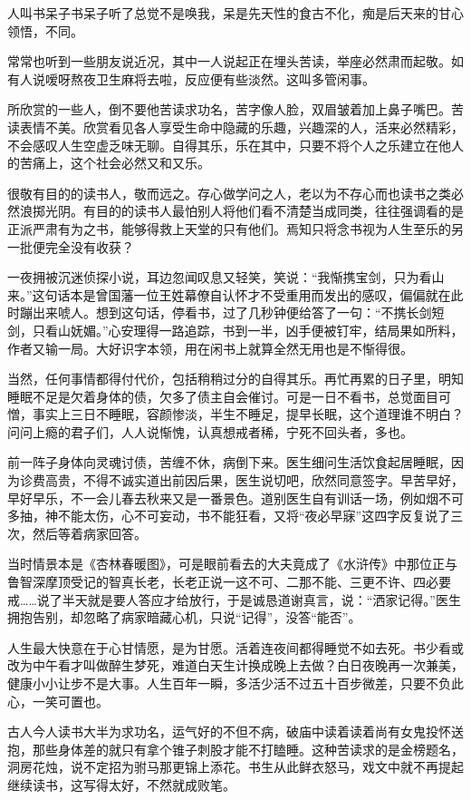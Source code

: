 \par 人叫书呆子书呆子听了总觉不是唤我，呆是先天性的食古不化，痴是后天来的甘心领悟，不同。
\par 常常也听到一些朋友说近况，其中一人说起正在埋头苦读，举座必然肃而起敬。如有人说嗳呀熬夜卫生麻将去啦，反应便有些淡然。这叫多管闲事。
\par 所欣赏的一些人，倒不要他苦读求功名，苦字像人脸，双眉皱着加上鼻子嘴巴。苦读表情不美。欣赏看见各人享受生命中隐藏的乐趣，兴趣深的人，活来必然精彩，不会感叹人生空虚乏味无聊。自得其乐，乐在其中，只要不将个人之乐建立在他人的苦痛上，这个社会必然又和又乐。
\par 很敬有目的的读书人，敬而远之。存心做学问之人，老以为不存心而也读书之类必然浪掷光阴。有目的的读书人最怕别人将他们看不清楚当成同类，往往强调看的是正派严肃有为之书，能够得救上天堂的只有他们。焉知只将念书视为人生至乐的另一批便完全没有收获？
\par 一夜拥被沉迷侦探小说，耳边忽闻叹息又轻笑，笑说：“我惭携宝剑，只为看山来。”这句话本是曾国藩一位王姓幕僚自认怀才不受重用而发出的感叹，偏偏就在此时蹦出来唬人。想到这句话，停看书，过了几秒钟便给答了一句：“不携长剑短剑，只看山妩媚。”心安理得一路追踪，书到一半，凶手便被钉牢，结局果如所料，作者又输一局。大好识字本领，用在闲书上就算全然无用也是不惭得很。
\par 当然，任何事情都得付代价，包括稍稍过分的自得其乐。再忙再累的日子里，明知睡眠不足是欠着身体的债，欠多了债主自会催讨。可是一日不看书，总觉面目可憎，事实上三日不睡眠，容颜惨淡，半生不睡足，提早长眠，这个道理谁不明白？问问上瘾的君子们，人人说惭愧，认真想戒者稀，宁死不回头者，多也。
\par 前一阵子身体向灵魂讨债，苦缠不休，病倒下来。医生细问生活饮食起居睡眠，因为诊费高贵，不得不诚实道出前因后果，医生说切吧，欣然同意签字。早苦早好，早好早乐，不一会儿春去秋来又是一番景色。道别医生自有训话一场，例如烟不可多抽，神不能太伤，心不可妄动，书不能狂看，又将“夜必早寐”这四字反复说了三次，然后等着病家回答。
\par 当时情景本是《杏林春暖图》，可是眼前看去的大夫竟成了《水浒传》中那位正与鲁智深摩顶受记的智真长老，长老正说一这不可、二那不能、三更不许、四必要戒……说了半天就是要人答应才给放行，于是诚恳道谢真言，说：“洒家记得。”医生拥抱告别，却忽略了病家暗藏心机，只说“记得”，没答“能否”。
\par 人生最大快意在于心甘情愿，是为甘愿。活着连夜间都得睡觉不如去死。书少看或改为中午看才叫做醉生梦死，难道白天生计换成晚上去做？白日夜晚再一次兼美，健康小小让步不是大事。人生百年一瞬，多活少活不过五十百步微差，只要不负此心，一笑可置也。
\par 古人今人读书大半为求功名，运气好的不但不病，破庙中读着读着尚有女鬼投怀送抱，那些身体差的就只有拿个锥子刺股才能不打瞌睡。这种苦读求的是金榜题名，洞房花烛，说不定招为驸马那更锦上添花。书生从此鲜衣怒马，戏文中就不再提起继续读书，这写得太好，不然就成败笔。
